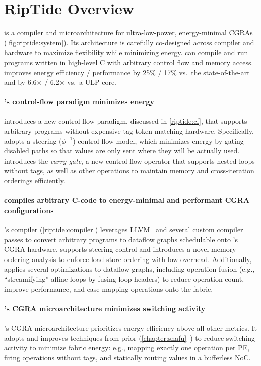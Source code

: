 \figRipTideSystem

\section{RipTide Overview}
\label{riptide:overview}

\riptide is a compiler and microarchitecture for ultra-low-power, energy-minimal CGRAs
(\autoref{fig:riptide:system}).
%
Its architecture is carefully co-designed across compiler and hardware
to maximize flexibility while minimizing energy.
% 
\riptide can compile and run programs written in high-level C with arbitrary control flow and memory access.
% 
\riptide improves energy efficiency / performance
by 25\% / 17\% vs.\ the
state-of-the-art~\cite{snafu} and by 6.6$\times$ / 6.2$\times$
vs.\ a ULP core.

\paragraph{\riptide's control-flow paradigm minimizes energy}
\riptide introduces a new control-flow paradigm, discussed in \autoref{riptide:cf}, that supports arbitrary programs without expensive tag-token matching hardware.
% 
Specifically, \riptide adopts a steering ($\phi^{-1}$) control-flow model, which minimizes energy by gating disabled paths so that values are only sent where they will be actually used.
% 
\riptide introduces the \emph{carry gate}, a new control-flow operator that supports nested loops without tags,
as well as other operations to maintain memory and cross-iteration orderings efficiently.
% 

\paragraph{\riptidecomp compiles arbitrary C-code to energy-minimal and performant CGRA configurations}
%
\riptide's compiler (\autoref{riptide:compiler}) leverages LLVM~\cite{llvm} and several
custom compiler passes to convert arbitrary programs to dataflow
graphs schedulable onto \riptide's CGRA hardware.
%
\riptidecomp supports steering control and introduces a novel
memory-ordering analysis to enforce load-store ordering with low
overhead.
% 
Additionally, \riptidecomp applies several optimizations to dataflow
graphs, including operation fusion (e.g., ``streamifying'' affine loops by fusing loop headers)
to reduce operation count, improve performance, and ease mapping operations onto the fabric.

\paragraph{\riptide's CGRA microarchitecture minimizes switching activity}
%
\riptide's CGRA microarchitecture prioritizes energy efficiency above all other metrics.
%
It adopts and improves techniques from prior \snafu (\autoref{chapter:snafu}~\cite{snafu}) to
reduce switching activity to minimize fabric energy:
%
e.g., mapping exactly one operation per PE,
firing operations without tags,
and statically routing values in a bufferless NoC.


